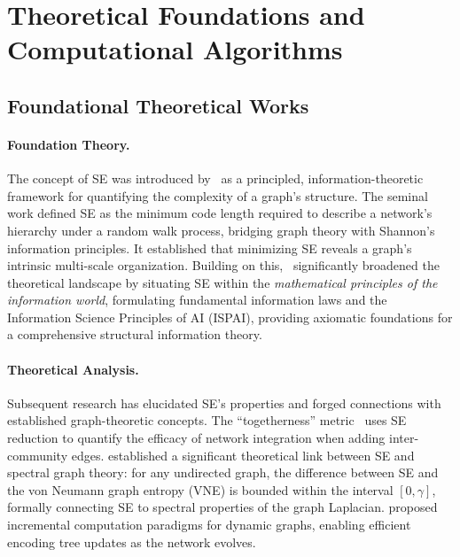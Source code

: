 \section{Theoretical Foundations and Computational Algorithms}
\label{sec:theory}
\label{sec:algorithms}

\subsection{Foundational Theoretical Works}
\label{subsec:theory-foundation}

\paragraph{Foundation Theory.}
The concept of SE was introduced by~\cite{Li2016} as a principled,
information-theoretic framework for quantifying the complexity of a graph's
structure.
The seminal work defined SE as the minimum code length required to describe a
network's hierarchy under a random walk process, bridging graph theory with
Shannon's information principles.
It established that minimizing SE reveals a graph's intrinsic multi-scale
organization.
Building on this,~\cite{li2024book} significantly broadened the theoretical
landscape by situating SE within the \emph{mathematical principles of the
information world}, formulating fundamental information laws and the
Information Science Principles of AI (ISPAI), providing axiomatic foundations
for a comprehensive structural information theory.

\paragraph{Theoretical Analysis.}
Subsequent research has elucidated SE's properties and forged connections with
established graph-theoretic concepts.
The ``togetherness'' metric~\cite{ljm2021improvingTogetherness} uses SE
reduction to quantify the efficacy of network integration when adding
inter-community edges.
\cite{liu2022similaritygap} established a significant theoretical link between
SE and spectral graph theory: for any undirected graph, the difference between
SE and the von Neumann graph entropy (VNE) is bounded within the interval
$[0,\gamma]$, formally connecting SE to spectral properties of the graph
Laplacian.
\cite{yang2024incremental} proposed incremental computation paradigms for
dynamic graphs, enabling efficient encoding tree updates as the network evolves.

